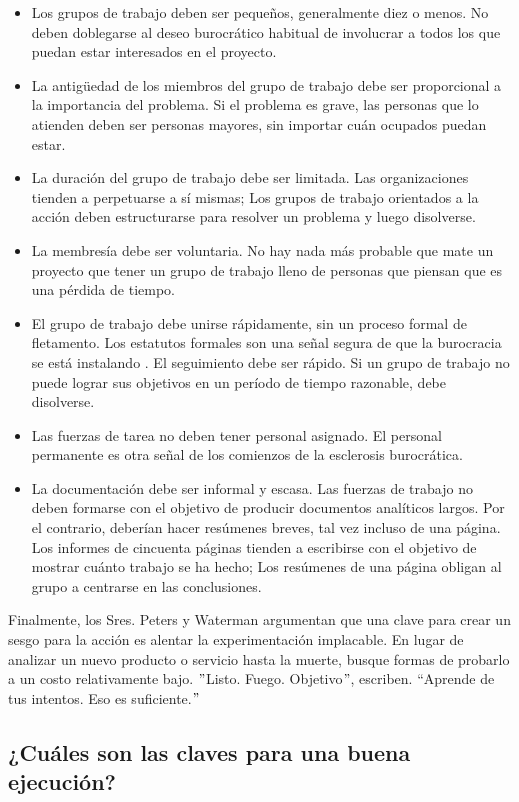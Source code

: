 \documentclass[10pt]{book}
\begin{document}
\begin{itemize}
\item Los grupos de trabajo deben ser pequeños, generalmente diez o menos. No deben doblegarse al deseo burocrático habitual de involucrar a todos los que puedan estar interesados en el proyecto.
\item La antigüedad de los miembros del grupo de trabajo debe ser proporcional a la importancia del problema. Si el problema es grave, las personas que lo atienden deben ser personas mayores, sin importar cuán ocupados puedan estar.
\item La duración del grupo de trabajo debe ser limitada. Las organizaciones tienden a perpetuarse a sí mismas; Los grupos de trabajo orientados a la acción deben estructurarse para resolver un problema y luego disolverse.
\item La membresía debe ser voluntaria. No hay nada más probable que mate un proyecto que tener un grupo de trabajo lleno de personas que piensan que es una pérdida de tiempo.
\item El grupo de trabajo debe unirse rápidamente, sin un proceso formal de fletamento. Los estatutos formales son una señal segura de que la burocracia se está
instalando . El seguimiento debe ser rápido. Si un grupo de trabajo no puede lograr sus objetivos en un período de tiempo razonable, debe disolverse.
\item Las fuerzas de tarea no deben tener personal asignado. El personal permanente es otra señal de los comienzos de la esclerosis burocrática.
\item La documentación debe ser informal y escasa. Las fuerzas de trabajo no deben formarse con el objetivo de producir documentos analíticos largos. Por el contrario, deberían hacer resúmenes breves, tal vez incluso de una página. Los informes de cincuenta páginas tienden a escribirse con el objetivo de mostrar cuánto trabajo se ha hecho; Los resúmenes de una página obligan al grupo a centrarse en las conclusiones.
\end{itemize}
Finalmente, los Sres. Peters y Waterman argumentan que una clave para crear un sesgo para la acción es alentar la experimentación implacable. En lugar de analizar un nuevo producto o servicio hasta la muerte, busque formas de probarlo a un costo relativamente bajo. $"$Listo. Fuego. Objetivo$"$, escriben. $“$Aprende de tus intentos. Eso es suficiente.$"$
\subsection{¿Cuáles son las claves para una buena ejecución?}
\end{document}
